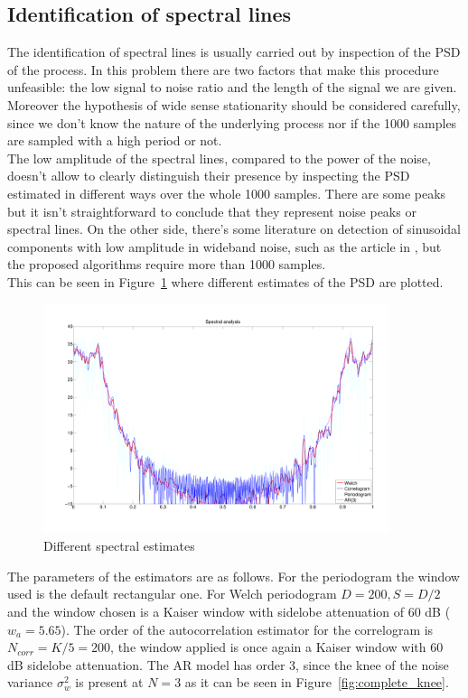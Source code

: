 \documentclass[10pt]{article}
\numberwithin{equation}{section}
\begin{document}
\subsection{Identification of spectral lines}
The identification of spectral lines is usually carried out by inspection of the PSD of the process. In this problem there are two factors that make this procedure unfeasible: the low signal to noise ratio and the length of the signal we are given. Moreover the hypothesis of wide sense stationarity should be considered carefully, since we don't know the nature of the underlying process nor if the 1000 samples are sampled with a high period or not. \\
The low amplitude of the spectral lines, compared to the power of the noise, doesn't allow to clearly distinguish their presence by inspecting the PSD estimated in different ways over the whole 1000 samples. There are some peaks but it isn't straightforward to conclude that they represent noise peaks or spectral lines. On the other side, there's some literature on detection of sinusoidal components with low amplitude in wideband noise, such as the article in \cite{lowamp}, but the proposed algorithms require more than 1000 samples.\\
This can be seen in Figure~\ref{fig:complete_psd} where different estimates of the PSD are plotted.
\begin{figure}[h!]
  \centering
  \includegraphics[width=0.9\textwidth]{images/psd}
  \caption{Different spectral estimates}
  \label{fig:complete_psd}
\end{figure}
The parameters of the estimators are as follows. For the periodogram the window used is the default rectangular one. For Welch periodogram $D = 200, S = D/2$ and the window chosen is a Kaiser window with sidelobe attenuation of 60 dB ($w_a = 5.65$). The order of the autocorrelation estimator for the correlogram is $N_{corr} = K/5 = 200$, the window applied is once again a Kaiser window with 60 dB sidelobe attenuation. The AR model has order 3, since the knee of the noise variance $\sigma_w^2$ is present at $N=3$ as it can be seen in Figure~\ref{fig:complete_knee}.
\end{document}
